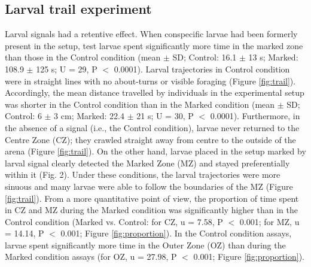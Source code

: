 			\subsection{Larval trail experiment}  
Larval signals had a retentive effect. When conspecific larvae had been formerly present in the setup, test larvae spent significantly more time in the marked zone than those in the Control condition (mean $\pm$ SD; Control: 16.1 $\pm$ 13 s; Marked: 108.9 $\pm$ 125 s; U = 29, P $<$ 0.0001). Larval trajectories in Control condition were in straight lines with no about-turns or visible foraging (Figure \ref{fig:trail}). Accordingly, the mean distance travelled by individuals in the experimental setup was shorter in the Control condition than in the Marked condition (mean $\pm$ SD; Control: 6 $\pm$ 3 cm; Marked: 22.4 $\pm$ 21 s; U = 30, P $<$ 0.0001). Furthermore, in the absence of a signal (i.e., the Control condition), larvae never returned to the Centre Zone (CZ); they crawled straight away from centre to the outside of the arena (Figure \ref{fig:trail}). On the other hand, larvae placed in the setup marked by larval signal clearly detected the Marked Zone (MZ) and stayed preferentially within it (Fig. 2). Under these conditions, the larval trajectories were more sinuous and many larvae were able to follow the boundaries of the MZ (Figure \ref{fig:trail}). From a more quantitative point of view, the proportion of time spent in CZ and MZ during the Marked condition was significantly higher than in the Control condition (Marked vs. Control: for CZ, u = 7.58, P $<$ 0.001; for MZ, u = 14.14, P $<$ 0.001; Figure \ref{fig:proportion}). In the Control condition assays, larvae spent significantly more time in the Outer Zone (OZ) than during the Marked condition assays (for OZ, u = 27.98, P $<$ 0.001; Figure \ref{fig:proportion}).            

